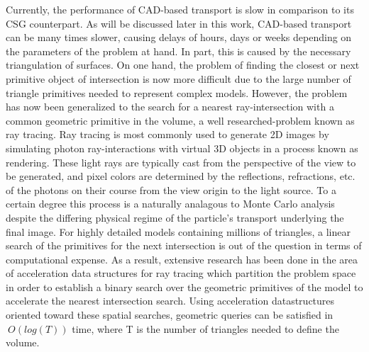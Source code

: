 \documentclass[12pt, a4paper]{article}
\begin{document}
Currently, the performance of CAD-based transport is slow in comparison to its CSG counterpart. As will be discussed later in this work, CAD-based transport can be many times slower, causing delays of hours, days or weeks depending on the parameters of the problem at hand. In part, this is caused by the necessary triangulation of surfaces. On one hand, the problem of finding the closest or next primitive object of intersection is now more difficult due to the large number of triangle primitives needed to represent complex models. However, the problem has now been generalized to the search for a nearest ray-intersection with a common geometric primitive in the volume, a well researched-problem known as ray tracing. Ray tracing is most commonly used to generate 2D images by simulating photon ray-interactions with virtual 3D objects in a process known as rendering. These light rays are typically cast from the perspective of the view to be generated, and pixel colors are determined by the reflections, refractions, etc. of the photons on their course from the view origin to the light source. To a certain degree this process is a naturally analagous to Monte Carlo analysis despite the differing physical regime of the particle's transport underlying the final image. For highly detailed models containing millions of triangles, a linear search of the primitives for the next intersection is out of the question in terms of computational expense. As a result, extensive research has been done in the area of acceleration data structures for ray tracing which partition the problem space in order to establish a binary search over the geometric primitives of the model to accelerate the nearest intersection search. Using acceleration datastructures oriented toward these spatial searches, geometric queries can be satisfied in $~O(log(T))$ time, where T is the number of triangles needed to define the volume.


\end{document}
